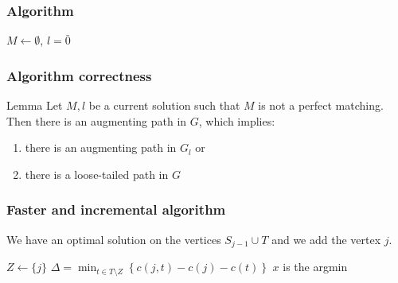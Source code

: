 \begin{frame}[fragile]
\frametitle{Algorithm}

\begin{algorithm}[H]
  $M\gets \emptyset$, $l=\bar{0}$\;
\end{algorithm}
\end{frame}

\begin{frame}[fragile]
\frametitle{Algorithm correctness}
\begin{block}{Lemma}
Let $M, l$ be a current solution such that $M$ is not a perfect matching.
Then there is an augmenting path in $G$, which implies:
\begin{enumerate}
      \item there is an augmenting path in $G_{l}$ or
\item there is a loose-tailed path in $G$
\end{enumerate}
\end{block}
\end{frame}

\begin{frame}[fragile]
\frametitle{Faster and incremental algorithm}

We have an optimal solution on the vertices $S_{j-1} \cup T$ and we add the
vertex $j$.

\begin{algorithm}[H]
  $Z\gets\{j\}$\;
  $\Delta = \min_{t\in T\setminus Z} \left\{ c(j,t) - c(j) -c(t)\right\}$\;
  $x$ is the argmin\;
\end{algorithm}
\end{frame}



